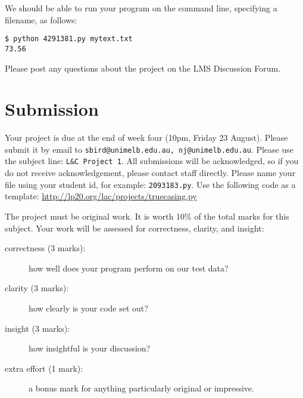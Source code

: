 \documentclass[a4paper,10pt]{article}
\begin{document}
We should be able to run your program on the command line, specifying a filename, as follows:

\begin{verbatim}
$ python 4291381.py mytext.txt
73.56
\end{verbatim}

Please post any questions about the project on the LMS Discussion Forum.

\section*{Submission}

Your project is due at the end of week four (10pm, Friday 23 August). Please submit it by email to
\texttt{sbird@unimelb.edu.au, nj@unimelb.edu.au}. Please use the subject line: \texttt{L\&C Project 1}.
All submissions will be acknowledged, so if you do not receive acknowledgement, please contact staff directly.
Please name your file using your student id, for example: \texttt{2093183.py}. Use the following code as a
template: \url{http://lp20.org/lac/projects/truecasing.py}

The project must be original work.
It is worth 10\% of the total marks for this subject.
Your work will be assessed for correctness, clarity, and insight:

\begin{description}
\item[correctness (3 marks):] how well does your program perform on our test data?
\item[clarity (3 marks):] how clearly is your code set out?
\item[insight (3 marks):] how insightful is your discussion?
\item[extra effort (1 mark):] a bonus mark for anything particularly original or impressive.
\end{description}
\end{document}
